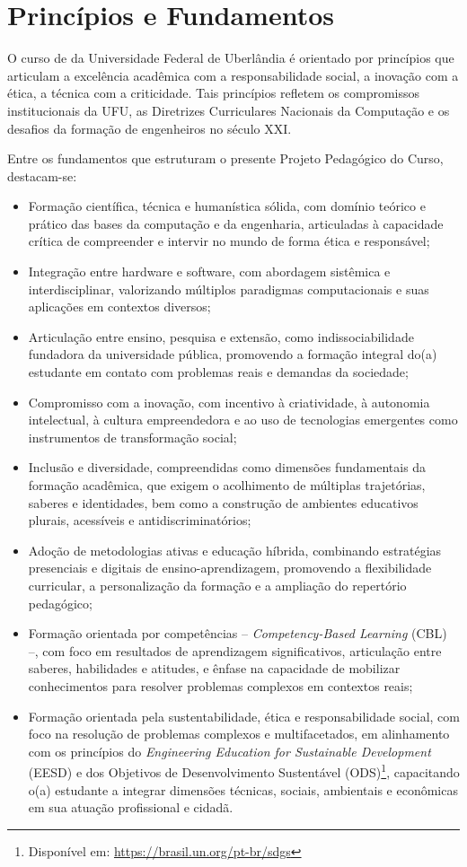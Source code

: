 \chapter{Princípios e Fundamentos}

O curso de \nomecursonovo da Universidade Federal de Uberlândia é orientado por princípios que articulam a excelência acadêmica com a responsabilidade social, a inovação com a ética, a técnica com a criticidade. Tais princípios refletem os compromissos institucionais da UFU, as Diretrizes Curriculares Nacionais da Computação e os desafios da formação de engenheiros no século XXI.

Entre os fundamentos que estruturam o presente Projeto Pedagógico do Curso, destacam-se:

\begin{itemize}
    \item Formação científica, técnica e humanística sólida, com domínio teórico e prático das bases da computação e da engenharia, articuladas à capacidade crítica de compreender e intervir no mundo de forma ética e responsável;
    \item Integração entre hardware e software, com abordagem sistêmica e interdisciplinar, valorizando múltiplos paradigmas computacionais e suas aplicações em contextos diversos;
    \item Articulação entre ensino, pesquisa e extensão, como indissociabilidade fundadora da universidade pública, promovendo a formação integral do(a) estudante em contato com problemas reais e demandas da sociedade;
    \item Compromisso com a inovação, com incentivo à criatividade, à autonomia intelectual, à cultura empreendedora e ao uso de tecnologias emergentes como instrumentos de transformação social;
    \item Inclusão e diversidade, compreendidas como dimensões fundamentais da formação acadêmica, que exigem o acolhimento de múltiplas trajetórias, saberes e identidades, bem como a construção de ambientes educativos plurais, acessíveis e antidiscriminatórios;
    \item Adoção de metodologias ativas e educação híbrida, combinando estratégias presenciais e digitais de ensino-aprendizagem, promovendo a flexibilidade curricular, a personalização da formação e a ampliação do repertório pedagógico;
    \item Formação orientada por competências -- \textit{Competency-Based Learning} (CBL) --, com foco em resultados de aprendizagem significativos, articulação entre saberes, habilidades e atitudes, e ênfase na capacidade de mobilizar conhecimentos para resolver problemas complexos em contextos reais;
    \item Formação orientada pela sustentabilidade, ética e responsabilidade social, com foco na resolução de problemas complexos e multifacetados, em alinhamento com os princípios do \textit{Engineering Education for Sustainable Development} (EESD) e dos Objetivos de Desenvolvimento Sustentável (ODS)\footnote{Disponível em: \url{https://brasil.un.org/pt-br/sdgs}}, capacitando o(a) estudante a integrar dimensões técnicas, sociais, ambientais e econômicas em sua atuação profissional e cidadã.
\end{itemize}

